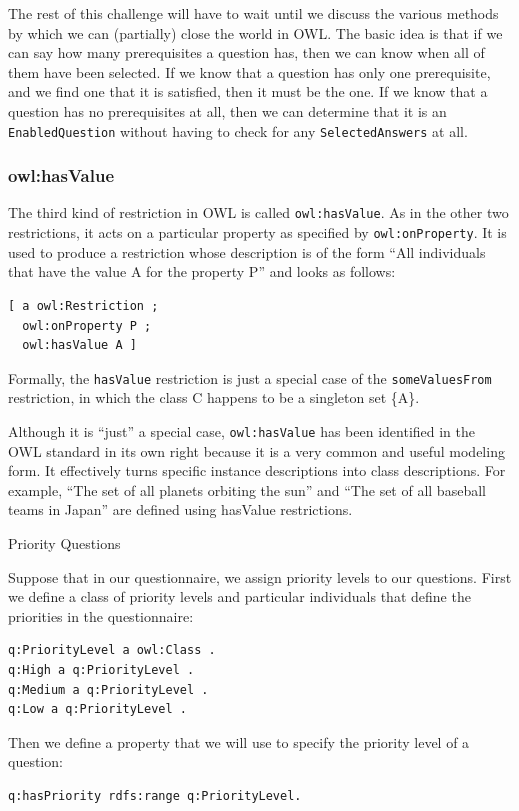 The rest of this challenge will have to wait until we discuss the
various methods by which we can (partially) close the world in OWL. The
basic idea is that if we can say how many prerequisites a question has,
then we can know when all of them have been selected. If we know that a
question has only one prerequisite, and we find one that it is
satisfied, then it must be the one. If we know that a question has no
prerequisites at all, then we can determine that it is an
\texttt{EnabledQuestion} without having to check for any \texttt{SelectedAnswers} at all.

\subsubsection{owl:hasValue}

The third kind of restriction in OWL is called \texttt{owl:hasValue}. As in the
other two restrictions, it acts on a particular property as specified by
\texttt{owl:onProperty}. It is used to produce a restriction whose description is
of the form ``All individuals that have the value A for the property P''
and looks as follows:

\begin{lstlisting}
[ a owl:Restriction ;
  owl:onProperty P ;
  owl:hasValue A ]
\end{lstlisting}

Formally, the \texttt{hasValue} restriction is just a special case of the
\texttt{someValuesFrom} restriction, in which the class C happens to be a
singleton set \{A\}.

Although it is ``just'' a special case, \texttt{owl:hasValue} has been identified
in the OWL standard in its own right because it is a very common and
useful modeling form. It effectively turns specific instance
descriptions into class descriptions. For example, ``The set of all
planets orbiting the sun'' and ``The set of all baseball teams in
Japan'' are defined using hasValue restrictions.

\begin{example}{Priority Questions}

Suppose that in our questionnaire, we assign priority levels to our
questions. First we define a class of priority levels and particular
individuals that define the priorities in the questionnaire:

\begin{lstlisting}
q:PriorityLevel a owl:Class .
q:High a q:PriorityLevel .
q:Medium a q:PriorityLevel .
q:Low a q:PriorityLevel .
\end{lstlisting}

Then we define a property that we will use to specify the priority level
of a question:

\begin{lstlisting}
q:hasPriority rdfs:range q:PriorityLevel.
\end{lstlisting}
\end{example}

